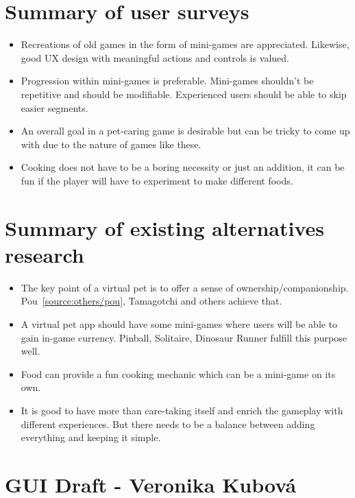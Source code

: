 \documentclass[11pt]{article}
\begin{document}
\section{Summary of user surveys}
\begin{itemize}
    \item Recreations of old games in the form of mini-games are appreciated. Likewise, good UX design with meaningful actions and controls is valued.
    \item Progression within mini-games is preferable. Mini-games shouldn't be repetitive and should be modifiable. Experienced users should be able to skip easier segments.
    \item An overall goal in a pet-caring game is desirable but can be tricky to come up with due to the nature of games like these.
    \item Cooking does not have to be a boring necessity or just an addition, it can be fun if the player will have to experiment to make different foods.
\end{itemize}

\section{Summary of existing alternatives research}
\begin{itemize}
    \item The key point of a virtual pet is to offer a sense of ownership/companionship. Pou~\ref{source:others/pou}, Tamagotchi and others achieve that.
    
    \item A virtual pet app should have some mini-games where users will be able to gain in-game currency. Pinball, Solitaire, Dinosaur Runner fulfill this purpose well.
    
    \item Food can provide a fun cooking mechanic which can be a mini-game on its own.
    
    \item It is good to have more than care-taking itself and enrich the gameplay with different experiences. But there needs to be a balance between adding everything and keeping it simple.
\end{itemize}


\newpage


    

\section{GUI Draft - Veronika Kubová}
\end{document}
